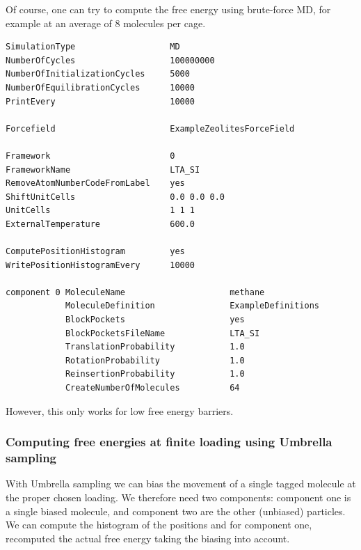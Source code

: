 Of course, one can try to compute the free energy using brute-force MD, for example at an average of 8 molecules per cage.
\begin{tiny}
\begin{verbatim}
SimulationType                   MD
NumberOfCycles                   100000000
NumberOfInitializationCycles     5000
NumberOfEquilibrationCycles      10000
PrintEvery                       10000

Forcefield                       ExampleZeolitesForceField

Framework                        0
FrameworkName                    LTA_SI
RemoveAtomNumberCodeFromLabel    yes
ShiftUnitCells                   0.0 0.0 0.0
UnitCells                        1 1 1
ExternalTemperature              600.0

ComputePositionHistogram         yes
WritePositionHistogramEvery      10000

component 0 MoleculeName                     methane
            MoleculeDefinition               ExampleDefinitions
            BlockPockets                     yes
            BlockPocketsFileName             LTA_SI
            TranslationProbability           1.0
            RotationProbability              1.0
            ReinsertionProbability           1.0
            CreateNumberOfMolecules          64
\end{verbatim}
\end{tiny}

However, this only works for low free energy barriers.

\subsubsection{Computing free energies at finite loading using Umbrella sampling}

With Umbrella sampling we can bias the movement of a single tagged molecule at the proper chosen loading.
We therefore need two components: component one is a single biased molecule, and component two are the
other (unbiased) particles.
We can compute the histogram of the positions and for component one, recomputed the actual free energy
taking the biasing into account.

